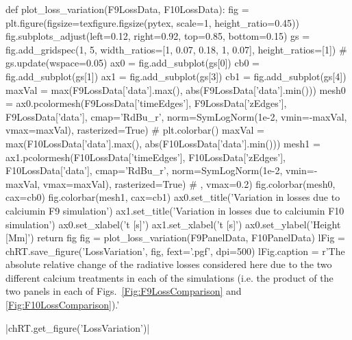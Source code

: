 \begin{pycode}[TimeDepRT]
def plot_loss_variation(F9LossData, F10LossData):
    fig = plt.figure(figsize=texfigure.figsize(pytex, scale=1, height_ratio=0.45))
    fig.subplots_adjust(left=0.12, right=0.92, top=0.85, bottom=0.15)
    gs = fig.add_gridspec(1, 5, width_ratios=[1, 0.07, 0.18, 1, 0.07], height_ratios=[1])
    # gs.update(wspace=0.05)
    ax0 = fig.add_subplot(gs[0])
    cb0 = fig.add_subplot(gs[1])
    ax1 = fig.add_subplot(gs[3])
    cb1 = fig.add_subplot(gs[4])
    maxVal = max(F9LossData['data'].max(), abs(F9LossData['data'].min()))
    mesh0 = ax0.pcolormesh(F9LossData['timeEdges'], F9LossData['zEdges'],
                        F9LossData['data'], cmap='RdBu_r', norm=SymLogNorm(1e-2, vmin=-maxVal, vmax=maxVal), rasterized=True)
    # plt.colorbar()
    maxVal = max(F10LossData['data'].max(), abs(F10LossData['data'].min()))
    mesh1 = ax1.pcolormesh(F10LossData['timeEdges'], F10LossData['zEdges'], F10LossData['data'],
                        cmap='RdBu_r', norm=SymLogNorm(1e-2, vmin=-maxVal, vmax=maxVal),
                        rasterized=True)
    #                        , vmax=0.2)
    fig.colorbar(mesh0, cax=cb0)
    fig.colorbar(mesh1, cax=cb1)
    ax0.set_title('Variation in losses due to calcium\ntreatment in F9 simulation')
    ax1.set_title('Variation in losses due to calcium\ntreatment in F10 simulation')
    ax0.set_xlabel('t [s]')
    ax1.set_xlabel('t [s]')
    ax0.set_ylabel('Height [Mm]')
    return fig
fig = plot_loss_variation(F9PanelData, F10PanelData)
lFig = chRT.save_figure('LossVariation', fig, fext='.pgf', dpi=500)
lFig.caption = r'The absolute relative change of the radiative losses considered here due to the two different calcium treatments in each of the simulations (i.e. the product of the two panels in each of Figs.~\ref{Fig:F9LossComparison} and \ref{Fig:F10LossComparison}).'
\end{pycode}
\py[TimeDepRT]|chRT.get_figure('LossVariation')|

